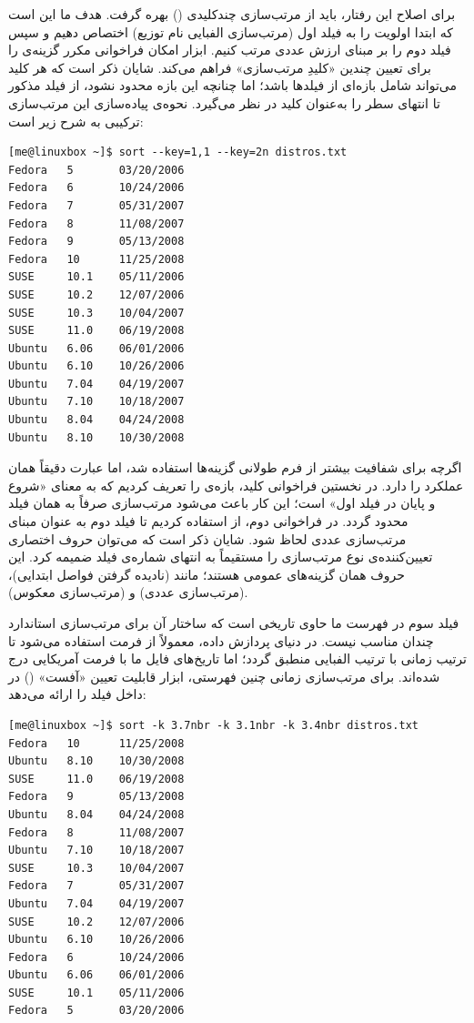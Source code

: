 برای اصلاح این رفتار، باید از مرتب‌سازی چند‌کلیدی () بهره گرفت. هدف ما این است که ابتدا اولویت را به فیلد اول (مرتب‌سازی الفبایی نام توزیع) اختصاص دهیم و سپس فیلد دوم را بر مبنای ارزش عددی مرتب کنیم. ابزار  امکان فراخوانی مکرر گزینه‌ی  را برای تعیین چندین «کلیدِ مرتب‌سازی» فراهم می‌کند. شایان ذکر است که هر کلید می‌تواند شامل بازه‌ای از فیلدها باشد؛ اما چنانچه این بازه محدود نشود،  از فیلد مذکور تا انتهای سطر را به‌عنوان کلید در نظر می‌گیرد. نحوه‌ی پیاده‌سازی این مرتب‌سازی ترکیبی به شرح زیر است:

\begin{latin}
\begin{lstlisting}
[me@linuxbox ~]$ sort --key=1,1 --key=2n distros.txt
Fedora   5       03/20/2006
Fedora   6       10/24/2006
Fedora   7       05/31/2007
Fedora   8       11/08/2007
Fedora   9       05/13/2008
Fedora   10      11/25/2008
SUSE     10.1    05/11/2006
SUSE     10.2    12/07/2006
SUSE     10.3    10/04/2007
SUSE     11.0    06/19/2008
Ubuntu   6.06    06/01/2006
Ubuntu   6.10    10/26/2006
Ubuntu   7.04    04/19/2007
Ubuntu   7.10    10/18/2007
Ubuntu   8.04    04/24/2008
Ubuntu   8.10    10/30/2008
\end{lstlisting}
\end{latin}

اگرچه برای شفافیت بیشتر از فرم طولانی گزینه‌ها استفاده شد، اما عبارت  دقیقاً همان عملکرد را دارد. در نخستین فراخوانی کلید، بازه‌ی  را تعریف کردیم که به معنای «شروع و پایان در فیلد اول» است؛ این کار باعث می‌شود مرتب‌سازی صرفاً به همان فیلد محدود گردد. در فراخوانی دوم، از  استفاده کردیم تا فیلد دوم به عنوان مبنای مرتب‌سازی عددی لحاظ شود. شایان ذکر است که می‌توان حروف اختصاری تعیین‌کننده‌ی نوع مرتب‌سازی را مستقیماً به انتهای شماره‌ی فیلد ضمیمه کرد. این حروف همان گزینه‌های عمومی  هستند؛ مانند  (نادیده گرفتن فواصل ابتدایی)،  (مرتب‌سازی عددی) و  (مرتب‌سازی معکوس).

فیلد سوم در فهرست ما حاوی تاریخی است که ساختار آن برای مرتب‌سازی استاندارد چندان مناسب نیست. در دنیای پردازش داده، معمولاً از فرمت  استفاده می‌شود تا ترتیب زمانی با ترتیب الفبایی منطبق گردد؛ اما تاریخ‌های فایل ما با فرمت آمریکایی  درج شده‌اند. برای مرتب‌سازی زمانی چنین فهرستی، ابزار  قابلیت تعیین «آفست» () در داخل فیلد را ارائه می‌دهد:

\begin{latin}
\begin{lstlisting}
[me@linuxbox ~]$ sort -k 3.7nbr -k 3.1nbr -k 3.4nbr distros.txt
Fedora   10      11/25/2008
Ubuntu   8.10    10/30/2008
SUSE     11.0    06/19/2008
Fedora   9       05/13/2008
Ubuntu   8.04    04/24/2008
Fedora   8       11/08/2007
Ubuntu   7.10    10/18/2007
SUSE     10.3    10/04/2007
Fedora   7       05/31/2007
Ubuntu   7.04    04/19/2007
SUSE     10.2    12/07/2006
Ubuntu   6.10    10/26/2006
Fedora   6       10/24/2006
Ubuntu   6.06    06/01/2006
SUSE     10.1    05/11/2006
Fedora   5       03/20/2006
\end{lstlisting}
\end{latin}

